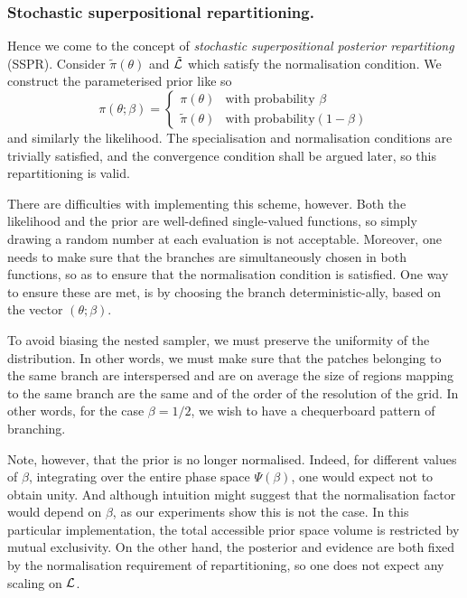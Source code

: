 \documentclass[usenatbib]{mnras}
\begin{document}
\subsubsection{Stochastic superpositional repartitioning.}
\label{sec:org1dcbac6}

Hence we come to the concept of \emph{stochastic superpositional
posterior repartitiong} (SSPR). Consider \(\tilde{\pi}(\theta)\) and
\({\cal \tilde{L}}\) which satisfy the normalisation
condition. We construct the parameterised prior like so
\begin{equation}
  \pi(\theta; \beta)  = \begin{cases}
	\pi(\theta) & \text{with probability } \beta\\
	\tilde{\pi}(\theta) & \text{with probability} (1- \beta)
	\end{cases}
\end{equation}
and similarly the likelihood.  The specialisation and
normalisation conditions are trivially satisfied, and the
convergence condition shall be argued later, so this
repartitioning is valid.

There are difficulties with implementing this scheme,
however. Both the likelihood and the prior are well-defined
single-valued functions, so simply drawing a random number at each
evaluation is not acceptable. Moreover, one needs to make sure
that the branches are simultaneously chosen in both functions, so
as to ensure that the normalisation condition is satisfied. One
way to ensure these are met, is by choosing the branch
deterministic-ally, based on the vector \((\theta; \beta)\). 

To avoid biasing the nested sampler, we must preserve the
uniformity of the distribution. In other words, we must make sure
that the patches belonging to the same branch are interspersed and
are on average the size of regions mapping to the same branch are
the same and of the order of the resolution of the grid. In other
words, for the case \(\beta=1/2\), we wish to have a chequerboard
pattern of branching. 

Note, however, that the prior is no longer normalised. Indeed, for
different values of \(\beta\), integrating over the entire phase
space \(\Psi(\beta)\), one would expect not to obtain unity. And
although intuition might suggest that the normalisation factor
would depend on \(\beta\), as our experiments show this is not the
case. In this particular implementation, the total accessible
prior space volume is restricted by mutual exclusivity. On the
other hand, the posterior and evidence are both fixed by the
normalisation requirement of repartitioning, so one does not
expect any scaling on \({\cal L}\). 
\end{document}
